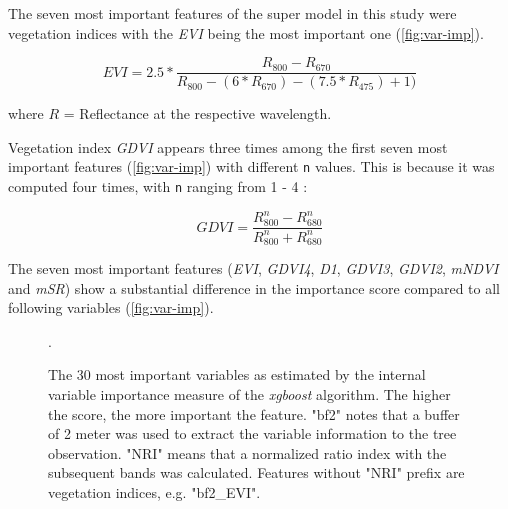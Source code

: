 \documentclass[review]{elsarticle}
\begin{document}
\noindent The seven most important features of the super model in this study were vegetation indices with the \textit{EVI} \citep{hueteComparisonVegetationIndices1997} being the most important one (\autoref{fig:var-imp}).

\begin{equation}
	EVI = 2.5*\frac{R_{800}-R_{670}}{R_{800}-(6*R_{670})-(7.5*R_{475})+1)}
\end{equation}

\noindent where $R$ = Reflectance at the respective wavelength.

\bigbreak

\noindent Vegetation index \textit{GDVI} appears three times among the first seven most important features (\autoref{fig:var-imp}) with different \texttt{n} values.
This is because it was computed four times, with \texttt{n} ranging from 1 - 4 \citep{wuEstimatingChlorophyllContent2008}:

\begin{equation}
	GDVI = \frac{R_{800}^n-R_{680}^n}{R_{800}^n+R_{680}^n}
\end{equation}

\bigbreak

\noindent The seven most important features (\textit{EVI}, \textit{GDVI4}, \textit{D1}, \textit{GDVI3}, \textit{GDVI2}, \textit{mNDVI} and \textit{mSR}) show a substantial difference in the importance score compared to all following variables (\autoref{fig:var-imp}).

\begin{figure} [b!]
	\begin{center}
		\caption{The 30 most important variables as estimated by the internal variable importance measure of the \textit{xgboost} algorithm. The higher the score, the more important the feature.
			"bf2" notes that a buffer of 2 meter was used to extract the variable information to the tree observation. "NRI" means that a normalized ratio index with the subsequent bands was calculated. Features without "NRI" prefix are vegetation indices, e.g. "bf2\_EVI".}. %
		\label{fig:var-imp}
	\end{center}
\end{figure}
\end{document}
